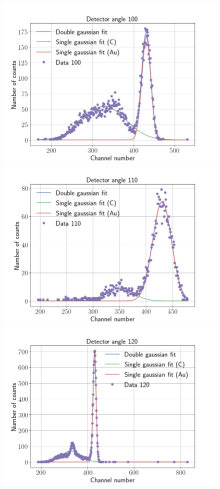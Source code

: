 \clearpage
\begin{figure}[t]
    \centering
\includegraphics[width=0.99\columnwidth]{Data_100}
\includegraphics[width=0.99\columnwidth]{Data_110}
\includegraphics[width=0.99\columnwidth]{Data_120}

\end{figure}
